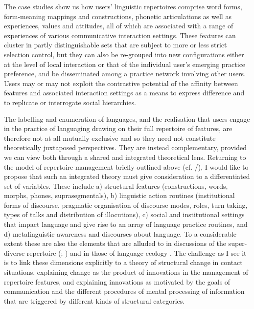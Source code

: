\documentclass[output=paper]{langscibook}
\begin{document}
The case studies show us how users’ linguistic repertoires comprise word forms, form-meaning mappings and constructions, phonetic articulations as well as experiences, values and attitudes, all of which are associated with a range of experiences of various communicative interaction settings. These features can cluster in partly distinguishable sets that are subject to more or less strict selection control, but they can also be re-grouped into new configurations either at the level of local interaction or that of the individual user’s emerging practice preference, and be disseminated among a practice network involving other users. Users may or may not exploit the contrastive potential of the affinity between features and associated interaction settings as a means to express difference and to replicate or interrogate social hierarchies.

The labelling and enumeration of languages, and the realisation that users engage in the practice of languaging drawing on their full repertoire of features, are therefore not at all mutually exclusive and so they need not constitute theoretically juxtaposed perspectives. They are instead complementary, provided we can view both through a shared and integrated theoretical lens. Returning to the model of repertoire management briefly outlined above (cf. \citealt{matras_language_2009}/\citeyear{matras_language_2020}), I would like to propose that such an integrated theory must give consideration to a differentiated set of variables. These include a) structural features (constructions, words, morphs, phones, suprasegmentals), b) linguistic action routines (institutional forms of discourse, pragmatic organisation of discourse modes, roles, turn taking, types of talks and distribution of illocutions), c) social and institutional settings that impact language and give rise to an array of language practice routines, and d) metalinguistic awareness and discourses about language. To a considerable extent these are also the elements that are alluded to in discussions of the super-diverse repertoire (\citealt{busch_linguistic_2012}; \citealt{blommaert_superdiverse_2013}) and in those of language ecology \citep{pennycook_language_2010}. The challenge as I see it is to link these dimensions explicitly to a theory of structural change in contact situations, explaining change as the product of innovations in the management of repertoire features, and explaining innovations as motivated by the goals of communication and the different procedures of mental processing of information that are triggered by different kinds of structural categories. 
\end{document}
